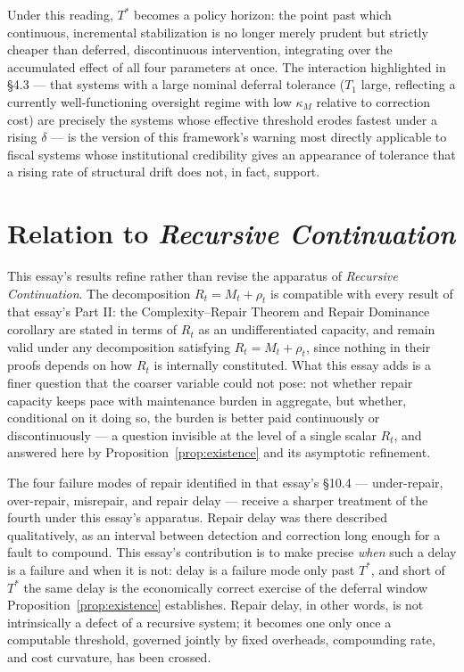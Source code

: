 \documentclass[11pt]{article}
\begin{document}
Under this reading, $T^*$ becomes a policy horizon: the point past which continuous, incremental stabilization is no longer merely prudent but strictly cheaper than deferred, discontinuous intervention, integrating over the accumulated effect of all four parameters at once. The interaction highlighted in \S 4.3 — that systems with a large nominal deferral tolerance ($T_1$ large, reflecting a currently well-functioning oversight regime with low $\kappa_M$ relative to correction cost) are precisely the systems whose effective threshold erodes fastest under a rising $\delta$ — is the version of this framework's warning most directly applicable to fiscal systems whose institutional credibility gives an appearance of tolerance that a rising rate of structural drift does not, in fact, support.

\section{Relation to \emph{Recursive Continuation}}

This essay's results refine rather than revise the apparatus of \emph{Recursive Continuation}. The decomposition $R_t = M_t + \rho_t$ is compatible with every result of that essay's Part II: the Complexity--Repair Theorem and Repair Dominance corollary are stated in terms of $R_t$ as an undifferentiated capacity, and remain valid under any decomposition satisfying $R_t = M_t + \rho_t$, since nothing in their proofs depends on how $R_t$ is internally constituted. What this essay adds is a finer question that the coarser variable could not pose: not whether repair capacity keeps pace with maintenance burden in aggregate, but whether, conditional on it doing so, the burden is better paid continuously or discontinuously — a question invisible at the level of a single scalar $R_t$, and answered here by Proposition~\ref{prop:existence} and its asymptotic refinement.

The four failure modes of repair identified in that essay's \S 10.4 — under-repair, over-repair, misrepair, and repair delay — receive a sharper treatment of the fourth under this essay's apparatus. Repair delay was there described qualitatively, as an interval between detection and correction long enough for a fault to compound. This essay's contribution is to make precise \emph{when} such a delay is a failure and when it is not: delay is a failure mode only past $T^*$, and short of $T^*$ the same delay is the economically correct exercise of the deferral window Proposition~\ref{prop:existence} establishes. Repair delay, in other words, is not intrinsically a defect of a recursive system; it becomes one only once a computable threshold, governed jointly by fixed overheads, compounding rate, and cost curvature, has been crossed.
\end{document}
